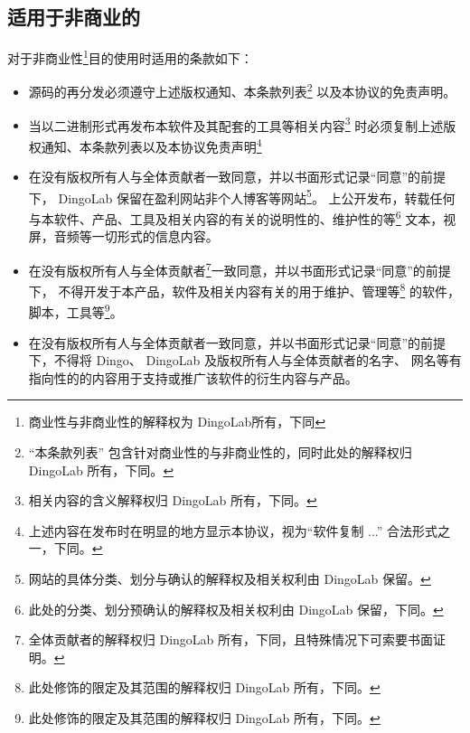   \subsection{适用于非商业的}
  对于非商业性\footnote{商业性与非商业性的解释权为 DingoLab所有，下同}目的使用时适用的条款如下：
  \begin{itemize}
    \item 源码的再分发必须遵守上述版权通知、本条款列表\footnote{“本条款列表” 包含针对商业性的与非商业性的，同时此处的解释权归 DingoLab 所有，下同。}
      以及本协议的免责声明。
    \item 当以二进制形式再发布本软件及其配套的工具等相关内容\footnote{相关内容的含义解释权归 DingoLab 所有，下同。}
      时必须复制上述版权通知、本条款列表以及本协议免责声明\footnote{上述内容在发布时在明显的地方显示本协议，视为“软件复制 ...” 合法形式之一，下同。}
    \item 在没有版权所有人与全体贡献者一致同意，并以书面形式记录“同意”的前提下，
      DingoLab 保留在盈利网站非个人博客等网站\footnote{网站的具体分类、划分与确认的解释权及相关权利由 DingoLab 保留。}。
      上公开发布，转载任何与本软件、产品、工具及相关内容的有关的说明性的、维护性的等\footnote{此处的分类、划分预确认的解释权及相关权利由 DingoLab 保留，下同。}
      文本，视屏，音频等一切形式的信息内容。
    \item 在没有版权所有人与全体贡献者\footnote{全体贡献者的解释权归 DingoLab 所有，下同，且特殊情况下可索要书面证明。}一致同意，并以书面形式记录“同意”的前提下，
      不得开发于本产品，软件及相关内容有关的用于维护、管理等\footnote{此处修饰的限定及其范围的解释权归 DingoLab 所有，下同。}
      的软件，脚本，工具等\footnote{此处修饰的限定及其范围的解释权归 DingoLab 所有，下同。}。
    \item 在没有版权所有人与全体贡献者一致同意，并以书面形式记录“同意”的前提下，不得将 Dingo、 DingoLab 及版权所有人与全体贡献者的名字、
      网名等有指向性的的内容用于支持或推广该软件的衍生内容与产品。
  \end{itemize}

